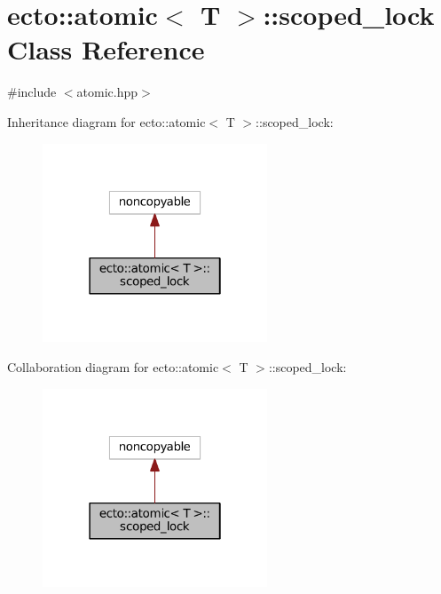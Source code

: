 \hypertarget{classecto_1_1atomic_1_1scoped__lock}{\section{ecto\-:\-:atomic$<$ T $>$\-:\-:scoped\-\_\-lock Class Reference}
\label{classecto_1_1atomic_1_1scoped__lock}
}


{\ttfamily \#include $<$atomic.\-hpp$>$}



Inheritance diagram for ecto\-:\-:atomic$<$ T $>$\-:\-:scoped\-\_\-lock\-:\nopagebreak
\begin{figure}[H]
\begin{center}
\leavevmode
\includegraphics[width=190pt]{classecto_1_1atomic_1_1scoped__lock__inherit__graph}
\end{center}
\end{figure}


Collaboration diagram for ecto\-:\-:atomic$<$ T $>$\-:\-:scoped\-\_\-lock\-:\nopagebreak
\begin{figure}[H]
\begin{center}
\leavevmode
\includegraphics[width=190pt]{classecto_1_1atomic_1_1scoped__lock__coll__graph}
\end{center}
\end{figure}
